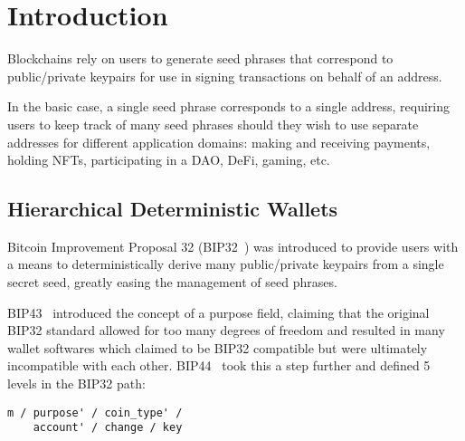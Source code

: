 \documentclass[12pt, a4paper, twocolumn]{article}
\begin{document}




\section{Introduction}

Blockchains rely on users to generate seed phrases that correspond to public/private keypairs for use in signing transactions on behalf of an address.

In the basic case, a single seed phrase corresponds to a single address, requiring users to keep track of many seed phrases should they wish to use separate addresses for different application domains: making and receiving payments, holding NFTs, participating in a DAO, DeFi, gaming, etc.


\subsection{Hierarchical Deterministic Wallets}
\label{subsec:hd_wallets}

Bitcoin Improvement Proposal 32 (BIP32~\cite{BIP32}) was introduced to provide users with a means to deterministically derive many public/private keypairs from a single secret seed, greatly easing the management of seed phrases.

BIP43~\cite{BIP43} introduced the concept of a purpose field, claiming that the original BIP32 standard allowed for too many degrees of freedom and resulted in many wallet softwares which claimed to be BIP32 compatible but were ultimately incompatible with each other. BIP44~\cite{BIP44} took this a step further and defined 5 levels in the BIP32 path:
\begin{verbatim}
m / purpose' / coin_type' /
    account' / change / key
\end{verbatim}
\end{document}
